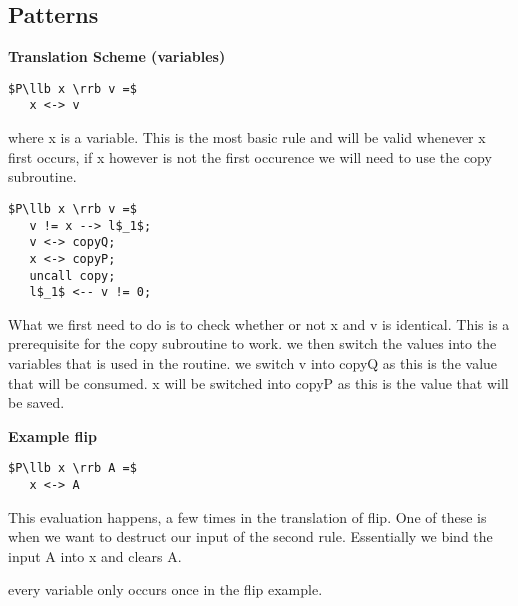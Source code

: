\documentclass[a4paper]{article}
\begin{document}
\subsection{Patterns}
\label{sec:org5433f1f}
\begin{minipage}[t]{0.6\textwidth}
\textbf{Translation Scheme (variables)}
\begin{lstlisting}
$P\llb x \rrb v =$
   x <-> v
\end{lstlisting}
where x is a variable. This is the most basic rule and will be valid whenever x first occurs, if x however is not the first occurence we will need to use the copy subroutine.
\begin{lstlisting}
$P\llb x \rrb v =$
   v != x --> l$_1$;
   v <-> copyQ;
   x <-> copyP;
   uncall copy;
   l$_1$ <-- v != 0;
\end{lstlisting}
What we first need to do is to check whether or not x and v is identical. This is a prerequisite for the copy subroutine to work. we then switch the values into the variables that is used in the routine. we switch v into copyQ as this is the value that will be consumed. x will be switched into copyP as this is the value that will be saved.
\end{minipage}
\qquad
\begin{minipage}[t]{0.4\textwidth}
\textbf{Example flip}
\begin{lstlisting}
$P\llb x \rrb A =$
   x <-> A
\end{lstlisting}
This evaluation happens, a few times in the translation of flip. One of these is when we want to destruct our input of the second rule. Essentially we bind the input A into x and clears A.

every variable only occurs once in the flip example.
\end{minipage}
\end{document}

